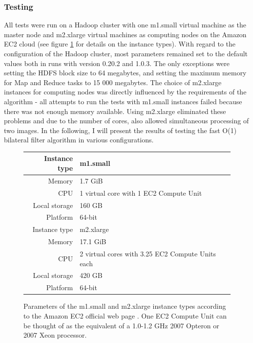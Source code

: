 \documentclass [12pt,a4paper]{report}
\begin{document}
\subsubsection{Testing}

All tests were run on a Hadoop cluster with one m1.small virtual machine as the master node and m2.xlarge virtual machines as computing nodes on the Amazon EC2 cloud (see figure \ref{fig_instance_types} for details on the instance types). With regard to the configuration of the Hadoop cluster, most parameters remained set to the default values both in runs with version 0.20.2 and 1.0.3. The only exceptions were setting the HDFS block size to 64 megabytes, and setting the maximum memory for Map and Reduce tasks to 15 000 megabytes. The choice of m2.xlarge instances for computing nodes was directly influenced by the requirements of the algorithm - all attempts to run the tests with m1.small instances failed because there was not enough memory available. Using m2.xlarge eliminated these problems and due to the number of cores, also allowed simultaneous processing of two images. In the following, I will present the results of testing the fast O(1) bilateral filter algorithm in various configurations.

\begin{figure}[h]
\begin{center}
\begin{tabular}{r | l}
Instance type & m1.small \\
\hline
Memory & 1.7 GiB \\
CPU & 1 virtual core with 1 EC2 Compute Unit \\
Local storage & 160 GB \\
Platform & 64-bit \\
\hline\hline
Instance type & m2.xlarge \\
\hline
Memory & 17.1 GiB \\
CPU & 2 virtual cores with 3.25 EC2 Compute Units each \\
Local storage & 420 GB \\
Platform & 64-bit \\
\end{tabular}
\caption[Parameters of the m1.small and m2.xlarge instance types]{Parameters of the m1.small and m2.xlarge instance types according to the Amazon EC2 official web page \cite{ec2_instancetypes}. One EC2 Compute Unit can be thought of as the equivalent of a 
1.0-1.2 GHz 2007 Opteron or 2007 Xeon processor.}
\label{fig_instance_types}
\end{center}
\end{figure}
\end{document}
